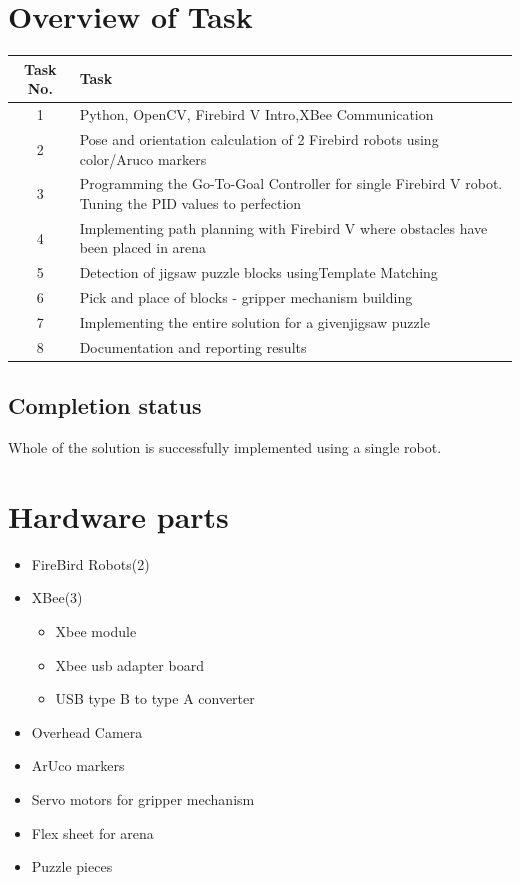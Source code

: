 \documentclass[a4paper,12pt,oneside]{book}
\begin{document}
\section*{Overview of Task}
\begin{tabular}{| c | p{27 em} | }\hline
		\textbf{Task No.} & \hspace{10 em}\textbf{Task}\\\hline
		1 &\small{ Python, OpenCV, Firebird V Intro,XBee Communication} \\\hline
		2 &\small{ Pose and orientation calculation of 2 Firebird robots using\hspace{3 em} color/Aruco markers }\\\hline
		3 &\small{ Programming the Go-To-Goal Controller for single Firebird V robot. Tuning the PID\hspace{0 em} values to perfection }\\\hline
		4 &\small{ Implementing path planning with Firebird V where obstacles have been placed in arena }\\\hline
		5 &\small{ Detection of jigsaw puzzle blocks using\hspace{0 em}Template Matching}\\\hline
		6 &\small{ Pick and place of blocks - gripper mechanism building }\\\hline
		7 &\small{ Implementing the entire solution for a given\hspace{0 em}jigsaw puzzle }\\\hline
		8 &\small{ Documentation and reporting results }\\\hline
	\end{tabular}

\subsection*{Completion status}
Whole of the solution is successfully implemented using a single robot.  

\section{Hardware parts}
\begin{itemize}
  \item FireBird Robots(2)
  \item  XBee(3)
  \begin{itemize}
  \item Xbee module
  \item Xbee usb adapter board
  \item USB type B to type A converter
  \end{itemize}
   \item Overhead Camera
   \item ArUco markers
   \item Servo motors for gripper mechanism
   \item Flex sheet for arena
   \item Puzzle pieces
\end{itemize}
\end{document}

